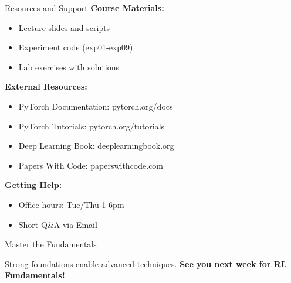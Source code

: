 \documentclass[aspectratio=169,10pt]{beamer}
\begin{document}
\begin{frame}{Resources and Support}
\textbf{Course Materials:}
\begin{itemize}
    \item Lecture slides and scripts
    \item Experiment code (exp01-exp09)
    \item Lab exercises with solutions
\end{itemize}

\textbf{External Resources:}
\begin{itemize}
    \item PyTorch Documentation: pytorch.org/docs
    \item PyTorch Tutorials: pytorch.org/tutorials
    \item Deep Learning Book: deeplearningbook.org
    \item Papers With Code: paperswithcode.com
\end{itemize}

\textbf{Getting Help:}
\begin{itemize}
    \item Office hours: Tue/Thu 1-6pm
    \item Short Q\&A via Email
\end{itemize}
\end{frame}

\begin{frame}{Master the Fundamentals}
\begin{center}
\Large{Strong foundations enable advanced techniques.}
\vfill
\textbf{See you next week for RL Fundamentals!}
\end{center}
\end{frame}
\end{document}
